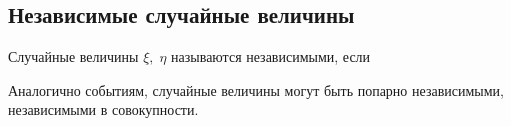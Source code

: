 \subsection{Независимые случайные величины}

\begin{definition}
    Случайные величины $\xi, \; \eta$ называются независимыми, если 
\end{definition}

Аналогично событиям, случайные величины могут быть попарно независимыми, независимыми в совокупности.

\newpage